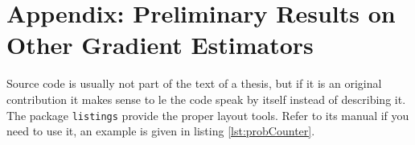 \chapter{Appendix: Preliminary Results on Other Gradient Estimators}\label{chap:appendix}

Source code is usually not part of the text of a thesis, but if it is an original contribution it makes sense to le the code speak by itself instead of describing it. The package \verb!listings! provide the proper layout tools. Refer to its manual if you need to use it, an example is given in listing \ref{lst:probCounter}.


